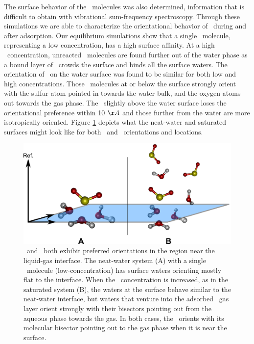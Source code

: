The surface behavior of the \suldiox~molecules was also determined, information that is difficult to obtain with vibrational sum-frequency spectroscopy. Through these simulations we are able to characterize the orientational behavior of \suldiox~during and after adsorption. Our equilibrium simulations show that a single \suldiox~molecule, representing a low concentration, has a high surface affinity. At a high \suldiox~concentration, unreacted \suldiox~molecules are found further out of the water phase as a bound layer of \suldiox~crowds the surface and binds all the surface waters. The orientation of \suldiox~on the water surface was found to be similar for both low and high concentrations. Those \suldiox~molecules at or below the surface strongly orient with the sulfur atom pointed in towards the water bulk, and the oxygen atoms out towards the gas phase. The \suldiox~slightly above the water surface loses the orientational preference within 10 $\AA$ and those further from the water are more isotropically oriented. Figure \ref{fig:so2-surface-cartoon} depicts what the neat-water and saturated surfaces might look like for both \suldiox~and \wat~orientations and locations.

\begin{figure}[h!]
	\begin{center}
		\includegraphics[scale=1.0]{images/angle-cartoons/system-surface.png}
		\caption{\wat~and \suldiox~both exhibit preferred orientations in the region near the liquid-gas interface. The neat-water system (A) with a single \suldiox~molecule (low-concentration) has surface waters orienting mostly flat to the interface. When the \suldiox~concentration is increased, as in the saturated system (B), the waters at the surface behave similar to the neat-water interface, but waters that venture into the adsorbed \suldiox~gas layer orient strongly with their bisectors pointing out from the aqueous phase towards the gas. In both cases, the \suldiox~orients with its molecular bisector pointing out to the gas phase when it is near the surface.}
		\label{fig:so2-surface-cartoon}
	\end{center}
\end{figure}


